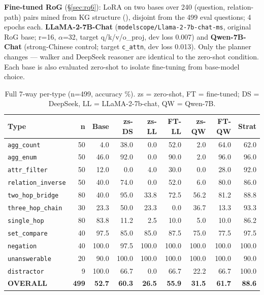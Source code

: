 \documentclass[review]{elsarticle}
\newcommand{\qtype}[1]{\texttt{\small #1}}
\begin{document}
\textbf{Fine-tuned RoG} (§\ref{sec:rq6}): LoRA on two bases over 240 (question, relation-path) pairs mined from KG structure (), disjoint from the 499 eval questions; 4 epochs each. \textbf{LLaMA-2-7B-Chat} (\texttt{modelscope/Llama-2-7b-chat-ms}, original RoG base; r=16, $\alpha$=32, target q/k/v/o\_proj, dev loss 0.007) and \textbf{Qwen-7B-Chat} (strong-Chinese control; target \texttt{c\_attn}, dev loss 0.013). Only the planner changes --- walker and DeepSeek reasoner are identical to the zero-shot condition. Each base is also evaluated zero-shot to isolate fine-tuning from base-model choice.

\begin{table}[t]
\centering
\small
\caption{Full 7-way per-type (n=499, accuracy \%). zs = zero-shot, FT = fine-tuned; DS = DeepSeek, LL = LLaMA-2-7b-chat, QW = Qwen-7B.}
\label{tab:rog5way}
\setlength{\tabcolsep}{3.5pt}
\begin{tabular}{l r r r r r r r r}
\toprule
\textbf{Type} & \textbf{n} & \textbf{Base} & \textbf{zs-DS} & \textbf{zs-LL} & \textbf{FT-LL} & \textbf{zs-QW} & \textbf{FT-QW} & \textbf{Strat} \\
\midrule
\qtype{agg\_count}        & 50 & 4.0  & 38.0 & 0.0   & 52.0 & 2.0   & 64.0 & 62.0 \\
\qtype{agg\_enum}         & 50 & 46.0 & 92.0 & 0.0   & 90.0 & 2.0   & 96.0 & 96.0 \\
\qtype{attr\_filter}      & 50 & 12.0 & 0.0  & 4.0   & 30.0 & 0.0   & 28.0 & 92.0 \\
\qtype{relation\_inverse} & 50 & 40.0 & 74.0 & 0.0   & 52.0 & 6.0   & 80.0 & 86.0 \\
\qtype{two\_hop\_bridge}  & 80 & 40.0 & 95.0 & 33.8  & 72.5 & 56.2  & 81.2 & 88.8 \\
\qtype{three\_hop\_chain} & 30 & 23.3 & 50.0 & 23.3  & 0.0  & 36.7  & 13.3 & 93.3 \\
\qtype{single\_hop}       & 80 & 83.8 & 11.2 & 2.5   & 10.0 & 5.0   & 10.0 & 86.2 \\
\qtype{set\_compare}      & 40 & 97.5 & 85.0 & 85.0  & 87.5 & 75.0  & 77.5 & 97.5 \\
\qtype{negation}          & 40 & 100.0& 97.5 & 100.0 & 100.0& 100.0 & 100.0& 100.0 \\
\qtype{unanswerable}      & 20 & 90.0 & 100.0& 100.0 & 100.0& 100.0 & 100.0& 90.0 \\
\qtype{distractor}        & 9  & 100.0& 66.7 & 0.0   & 66.7 & 22.2  & 66.7 & 100.0 \\
\midrule
\textbf{OVERALL} & \textbf{499} & \textbf{52.7} & \textbf{60.3} & \textbf{26.5} & \textbf{55.9} & \textbf{31.5} & \textbf{61.7} & \textbf{88.6} \\
\bottomrule
\end{tabular}
\end{table}
\end{document}
